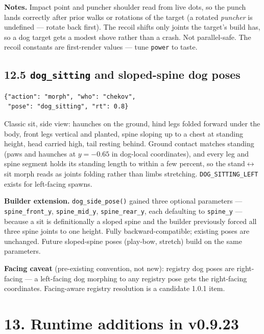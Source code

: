 \documentclass[
  11pt,
]{book}
\begin{document}
\textbf{Notes.} Impact point and puncher shoulder read from live
dots, so the punch lands correctly after prior walks or rotations of
the target (a rotated \emph{puncher} is undefined --- rotate back
first). The recoil shifts only joints the target's build has, so a
dog target gets a modest shove rather than a crash. Not
parallel-safe. The recoil constants are first-render values ---
tune \texttt{power} to taste.

\subsection{\texorpdfstring{12.5 \texttt{dog\_sitting} and sloped-spine
dog poses}{12.5 dog\_sitting and sloped-spine dog poses}}\label{dog-sitting}

\begin{verbatim}
{"action": "morph", "who": "chekov",
 "pose": "dog_sitting", "rt": 0.8}
\end{verbatim}

Classic sit, side view: haunches on the ground, hind legs folded
forward under the body, front legs vertical and planted, spine
sloping up to a chest at standing height, head carried high, tail
resting behind. Ground contact matches standing (paws and haunches
at $y = -0.65$ in dog-local coordinates), and every leg and spine
segment holds its standing length to within a few percent, so the
stand$\leftrightarrow$sit morph reads as joints folding rather than
limbs stretching. \texttt{DOG\_SITTING\_LEFT} exists for left-facing
spawns.

\textbf{Builder extension.} \texttt{dog\_side\_pose()} gained three
optional parameters --- \texttt{spine\_front\_y},
\texttt{spine\_mid\_y}, \texttt{spine\_rear\_y}, each defaulting to
\texttt{spine\_y} --- because a sit is definitionally a sloped spine
and the builder previously forced all three spine joints to one
height. Fully backward-compatible; existing poses are unchanged.
Future sloped-spine poses (play-bow, stretch) build on the same
parameters.

\textbf{Facing caveat} (pre-existing convention, not new): registry
dog poses are right-facing --- a left-facing dog morphing to any
registry pose gets the right-facing coordinates. Facing-aware
registry resolution is a candidate 1.0.1 item.

\section{13. Runtime additions in
v0.9.23}\label{runtime-additions-in-v0.9.23}
\end{document}
